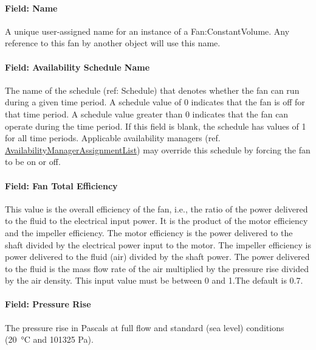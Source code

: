 \paragraph{Field: Name}\label{field-name-018}

A unique user-assigned name for an instance of a Fan:ConstantVolume. Any reference to this fan by another object will use this name.

\paragraph{Field: Availability Schedule Name}\label{field-availability-schedule-name-007}

The name of the schedule (ref: Schedule) that denotes whether the fan can run during a given time period. A schedule value of 0 indicates that the fan is off for that time period. A schedule value greater than 0 indicates that the fan can operate during the time period. If this field is blank, the schedule has values of 1 for all time periods. Applicable availability managers (ref. \hyperref[availabilitymanagerassignmentlist]{AvailabilityManagerAssignmentList}) may override this schedule by forcing the fan to be on or off.

\paragraph{Field: Fan Total Efficiency}\label{field-fan-total-efficiency-000}

This value is the overall efficiency of the fan, i.e., the ratio of the power delivered to the fluid to the electrical input power. It is the product of the motor efficiency and the impeller efficiency. The motor efficiency is the power delivered to the shaft divided by the electrical power input to the motor. The impeller efficiency is power delivered to the fluid (air) divided by the shaft power. The power delivered to the fluid is the mass flow rate of the air multiplied by the pressure rise divided by the air density. This input value must be between 0 and 1.The default is 0.7.

\paragraph{Field: Pressure Rise}\label{field-pressure-rise}

The pressure rise in Pascals at full flow and standard (sea level) conditions (\SI{20}{\celsius} and 101325 Pa).

